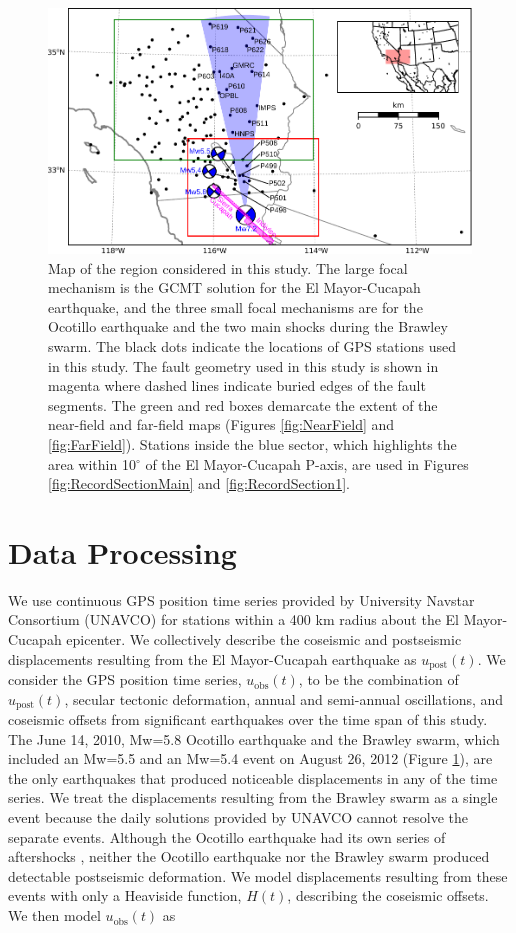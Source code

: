 \documentclass[draft,linenumbers]{AGUJournal}
\begin{document}
\begin{figure}
\includegraphics[scale=0.8]{Figures/2016jb013114-p01} 
\caption{Map of the region considered in this study.  The large focal mechanism is the GCMT solution for the El Mayor-Cucapah earthquake, and the three small focal mechanisms are for the Ocotillo earthquake and the two main shocks during the Brawley swarm.  The black dots indicate the locations of GPS stations used in this study.  The fault geometry used in this study is shown in magenta where dashed lines indicate buried edges of the fault segments.  The green and red boxes demarcate the extent of the near-field and far-field maps (Figures \ref{fig:NearField} and \ref{fig:FarField}).  Stations inside the blue sector, which highlights the area within 10$^\circ$ of the El Mayor-Cucapah P-axis, are used in Figures \ref{fig:RecordSectionMain} and \ref{fig:RecordSection1}.}       
\label{fig:ContextMap}
\end{figure}

\section{Data Processing}\label{sec:Data}
We use continuous GPS position time series provided by University Navstar Consortium (UNAVCO) for stations within a 400 km radius about the El Mayor-Cucapah epicenter. We collectively describe the coseismic and postseismic displacements resulting from the El Mayor-Cucapah earthquake as $u_\mathrm{post}(t)$.  We consider the GPS position time series, $u_\mathrm{obs}(t)$, to be the combination of $u_\mathrm{post}(t)$, secular tectonic deformation, annual and semi-annual oscillations, and coseismic offsets from significant earthquakes over the time span of this study.  The June 14, 2010, Mw=5.8 Ocotillo earthquake and the Brawley swarm, which included an Mw=5.5 and an Mw=5.4 event on August 26, 2012 (Figure \ref{fig:ContextMap}), are the only earthquakes that produced noticeable displacements in any of the time series.  We treat the displacements resulting from the Brawley swarm as a single event because the daily solutions provided by UNAVCO cannot resolve the separate events.  Although the Ocotillo earthquake had its own series of aftershocks \citep{Hauksson2011}, neither the Ocotillo earthquake nor the Brawley swarm produced detectable postseismic deformation.  We model displacements resulting from these events with only a Heaviside function, $H(t)$, describing the coseismic offsets.  We then model $u_\mathrm{obs}(t)$ as 
\end{document}
